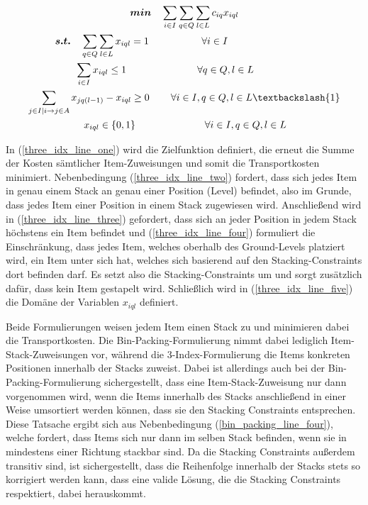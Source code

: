 \begin{gather}
\boldsymbol{min} \quad \sum_{i \in I} \sum_{q \in Q} \sum_{l \in L} c_{iq} x_{iql} \label{three_idx_line_one} \\
\boldsymbol{s.t.} \quad \sum_{q \in Q} \sum_{l \in L} x_{iql} = 1 \quad\thinspace\thinspace\quad\quad\quad\quad \forall i \in I \thinspace\thinspace\quad\quad\quad\quad\quad\quad\quad\quad\thinspace\thinspace \label{three_idx_line_two} \\
\sum_{i \in I} x_{iql} \leq 1 \thinspace\quad\quad\quad\quad\quad\quad\quad \forall q \in Q, l \in L \thinspace\thinspace\thinspace\thinspace\quad\quad\quad\thinspace \label{three_idx_line_three} \\
\sum_{j \in I | i \rightarrow j \in A} x_{jq(l-1)} - x_{iql} \geq 0 \thinspace\quad\quad \forall i \in I, q \in Q, l \in L \textbackslash \{1\}
\label{three_idx_line_four} \\
\quad\quad x_{iql} \in \{0, 1\} \quad\quad\quad\quad\quad\quad\quad \forall i \in I, q \in Q, l \in L \quad\thinspace\thinspace\thinspace\thinspace\thinspace \label{three_idx_line_five}
\end{gather}

In (\ref{three_idx_line_one}) wird die Zielfunktion definiert, die erneut die Summe der Kosten sämtlicher Item-Zuweisungen
und somit die Transportkosten minimiert.
Nebenbedingung (\ref{three_idx_line_two}) fordert, dass sich jedes Item in genau einem Stack an genau einer Position (Level) befindet,
also im Grunde, dass jedes Item einer Position in einem Stack zugewiesen wird.
Anschließend wird in (\ref{three_idx_line_three}) gefordert, dass sich an jeder Position in jedem Stack höchstens ein Item befindet und
(\ref{three_idx_line_four}) formuliert die Einschränkung, dass jedes Item, welches oberhalb des Ground-Levels platziert wird,
ein Item unter sich hat, welches sich basierend auf den Stacking-Constraints dort befinden darf.
Es setzt also die Stacking-Constraints um und sorgt zusätzlich dafür, dass kein Item  gestapelt wird.
Schließlich wird in (\ref{three_idx_line_five}) die Domäne der Variablen $x_{iql}$ definiert.

Beide Formulierungen weisen jedem Item einen Stack zu und minimieren dabei die Transportkosten.
Die Bin-Packing-Formulierung nimmt dabei lediglich Item-Stack-Zuweisungen vor, während die 3-Index-Formulierung die
Items konkreten Positionen innerhalb der Stacks zuweist. Dabei ist allerdings auch bei der Bin-Packing-Formulierung
sichergestellt, dass eine Item-Stack-Zuweisung nur dann vorgenommen wird, wenn die Items innerhalb des Stacks anschließend
in einer Weise umsortiert werden können, dass sie den Stacking Constraints entsprechen. Diese Tatsache ergibt sich aus Nebenbedingung (\ref{bin_packing_line_four}), welche fordert, dass Items sich nur dann im selben Stack befinden, wenn sie in mindestens einer Richtung stackbar sind.
Da die Stacking Constraints außerdem transitiv sind, ist sichergestellt, dass die Reihenfolge innerhalb der Stacks stets so korrigiert werden kann, dass eine valide Lösung, die die Stacking Constraints respektiert, dabei herauskommt.

